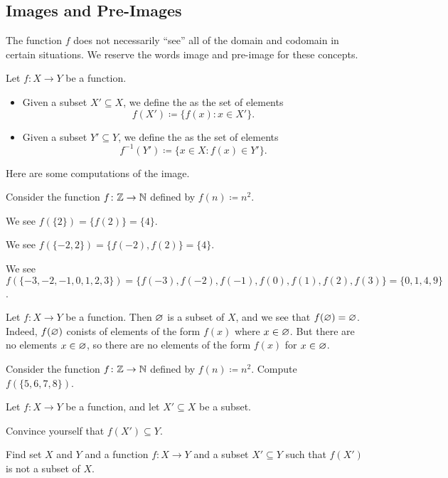 \documentclass[../notes.tex]{subfiles}
\begin{document}
\subsection{Images and Pre-Images}
The function $f$ does not necessarily ``see'' all of the domain and codomain in certain situations. We reserve the words image and pre-image for these concepts.
\begin{definition}
    Let $f\colon X\to Y$ be a function.
    \begin{itemize}
        \item Given a subset $X'\subseteq X$, we define the  as the set of elements
        \[f(X')\coloneqq\{f(x):x\in X'\}.\]
        \item Given a subset $Y'\subseteq Y$, we define the  as the set of elements
        \[f^{-1}(Y')\coloneqq\{x\in X:f(x)\in Y'\}.\]
    \end{itemize}
\end{definition}
Here are some computations of the image.
\begin{example}
    Consider the function $f\colon\mathbb Z\to\mathbb N$ defined by $f(n)\coloneqq n^2$.
    \begin{listalph}
        \item We see $f(\{2\})=\{f(2)\}=\{4\}$.
        \item We see $f(\{-2,2\})=\{f(-2),f(2)\}=\{4\}$.
        \item We see $f(\{-3,-2,-1,0,1,2,3\})=\{f(-3),f(-2),f(-1),f(0),f(1),f(2),f(3)\}=\{0,1,4,9\}$.
    \end{listalph}
\end{example}
\begin{example}
    Let $f\colon X\to Y$ be a function. Then $\varnothing$ is a subset of $X$, and we see that $f(\varnothing)=\varnothing$. Indeed, $f(\varnothing)$ conists of elements of the form $f(x)$ where $x\in\varnothing$. But there are no elements $x\in\varnothing$, so there are no elements of the form $f(x)$ for $x\in\varnothing$.
\end{example}
\begin{exe}
    Consider the function $f\colon\mathbb Z\to\mathbb N$ defined by $f(n)\coloneqq n^2$. Compute $f(\{5,6,7,8\})$.
\end{exe}
\begin{exe}
    Let $f\colon X\to Y$ be a function, and let $X'\subseteq X$ be a subset.
    \begin{listalph}
        \item Convince yourself that $f(X')\subseteq Y$.
        \item Find set $X$ and $Y$ and a function $f\colon X\to Y$ and a subset $X'\subseteq Y$ such that $f(X')$ is not a subset of $X$.
    \end{listalph}
\end{exe}
\end{document}
